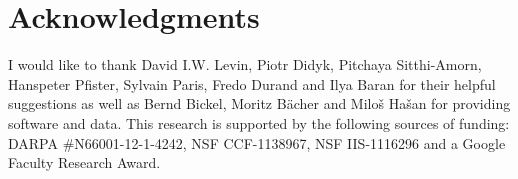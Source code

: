 
\chapter*{Acknowledgments}
\label{chap:ack}

I would like to thank David I.W. Levin, Piotr Didyk, Pitchaya Sitthi-Amorn, Hanspeter Pfister, Sylvain Paris, Fredo Durand and Ilya Baran for their helpful suggestions as well as Bernd Bickel, Moritz B\"{a}cher and  Milo\v{s} Ha\v{s}an for providing software and data. This research is supported by the following sources of funding:  DARPA $\#$N66001-12-1-4242,  NSF CCF-1138967, NSF IIS-1116296 and a Google Faculty Research Award.